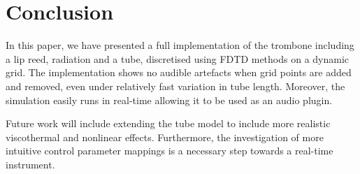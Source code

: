 \section{Conclusion}\label{sec:conclusion}
In this paper, we have presented a full implementation of the trombone including a lip reed, radiation and a tube, discretised using FDTD methods on a dynamic grid. The implementation shows no audible artefacts when grid points are added and removed, even under relatively fast variation in tube length. Moreover, the simulation easily runs in real-time allowing it to be used as an audio plugin. 

Future work will include extending the tube model to include more realistic viscothermal and nonlinear effects. Furthermore, the investigation of more intuitive control parameter mappings is a necessary step towards a real-time instrument.